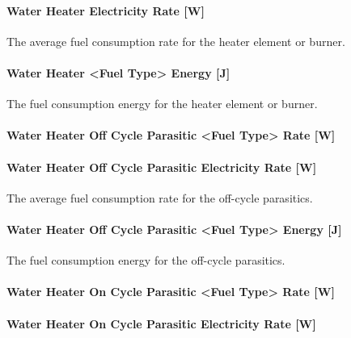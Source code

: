\paragraph{Water Heater Electricity Rate {[}W{]}}\label{water-heater-electric-power-w}

The average fuel consumption rate for the heater element or burner.

\paragraph{Water Heater \textless{}Fuel Type\textgreater{} Energy {[}J{]}}\label{water-heater-fuel-type-energy-j}

The fuel consumption energy for the heater element or burner.

\paragraph{Water Heater Off Cycle Parasitic \textless{}Fuel Type\textgreater{} Rate {[}W{]}}\label{water-heater-off-cycle-parasitic-fuel-type-rate-w}

\paragraph{Water Heater Off Cycle Parasitic Electricity Rate {[}W{]}}\label{water-heater-off-cycle-parasitic-electric-power-w-000}

The average fuel consumption rate for the off-cycle parasitics.

\paragraph{Water Heater Off Cycle Parasitic \textless{}Fuel Type\textgreater{} Energy {[}J{]}}\label{water-heater-off-cycle-parasitic-fuel-type-energy-j}

The fuel consumption energy for the off-cycle parasitics.

\paragraph{Water Heater On Cycle Parasitic \textless{}Fuel Type\textgreater{} Rate {[}W{]}}\label{water-heater-on-cycle-parasitic-fuel-type-rate-w}

\paragraph{Water Heater On Cycle Parasitic Electricity Rate {[}W{]}}\label{water-heater-on-cycle-parasitic-electric-power-w-000}

